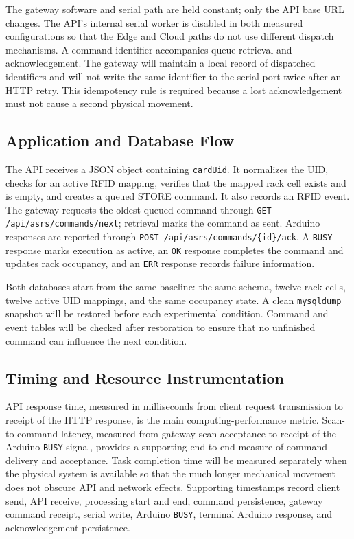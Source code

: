 \documentclass[conference]{IEEEtran}
\begin{document}
The gateway software and serial path are held constant; only the API base URL changes. The API's internal serial worker is disabled in both measured configurations so that the Edge and Cloud paths do not use different dispatch mechanisms. A command identifier accompanies queue retrieval and acknowledgement. The gateway will maintain a local record of dispatched identifiers and will not write the same identifier to the serial port twice after an HTTP retry. This idempotency rule is required because a lost acknowledgement must not cause a second physical movement.

\subsection{Application and Database Flow}
The API receives a JSON object containing \texttt{cardUid}. It normalizes the UID, checks for an active RFID mapping, verifies that the mapped rack cell exists and is empty, and creates a queued STORE command. It also records an RFID event. The gateway requests the oldest queued command through \texttt{GET /api/asrs/commands/next}; retrieval marks the command as sent. Arduino responses are reported through \texttt{POST /api/asrs/commands/\{id\}/ack}. A \texttt{BUSY} response marks execution as active, an \texttt{OK} response completes the command and updates rack occupancy, and an \texttt{ERR} response records failure information.

Both databases start from the same baseline: the same schema, twelve rack cells, twelve active UID mappings, and the same occupancy state. A clean \texttt{mysqldump} snapshot will be restored before each experimental condition. Command and event tables will be checked after restoration to ensure that no unfinished command can influence the next condition.

\subsection{Timing and Resource Instrumentation}
API response time, measured in milliseconds from client request transmission to receipt of the HTTP response, is the main computing-performance metric. Scan-to-command latency, measured from gateway scan acceptance to receipt of the Arduino \texttt{BUSY} signal, provides a supporting end-to-end measure of command delivery and acceptance. Task completion time will be measured separately when the physical system is available so that the much longer mechanical movement does not obscure API and network effects. Supporting timestamps record client send, API receive, processing start and end, command persistence, gateway command receipt, serial write, Arduino \texttt{BUSY}, terminal Arduino response, and acknowledgement persistence.
\end{document}
